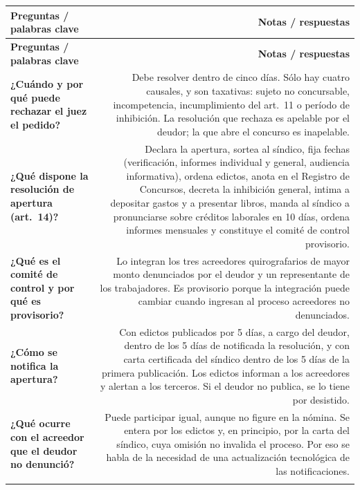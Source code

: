 \documentclass[12pt,oneside]{book}
\begin{document}
\begin{longtable}{QN}
\toprule
\textbf{Preguntas / palabras clave} & \textbf{Notas / respuestas} \\
\midrule
\endfirsthead
\toprule
\textbf{Preguntas / palabras clave} & \textbf{Notas / respuestas} \\
\midrule
\endhead

\textbf{¿Cuándo y por qué puede rechazar el juez el pedido?} &
Debe resolver dentro de cinco días. Sólo hay cuatro causales, y son taxativas: sujeto no concursable, incompetencia, incumplimiento del art.~11 o período de inhibición. La resolución que rechaza es apelable por el deudor; la que abre el concurso es inapelable. \\
\addlinespace[0.6em]

\textbf{¿Qué dispone la resolución de apertura (art.~14)?} &
Declara la apertura, sortea al síndico, fija fechas (verificación, informes individual y general, audiencia informativa), ordena edictos, anota en el Registro de Concursos, decreta la inhibición general, intima a depositar gastos y a presentar libros, manda al síndico a pronunciarse sobre créditos laborales en 10 días, ordena informes mensuales y constituye el comité de control provisorio. \\
\addlinespace[0.6em]

\textbf{¿Qué es el comité de control y por qué es provisorio?} &
Lo integran los tres acreedores quirografarios de mayor monto denunciados por el deudor y un representante de los trabajadores. Es provisorio porque la integración puede cambiar cuando ingresan al proceso acreedores no denunciados. \\
\addlinespace[0.6em]

\textbf{¿Cómo se notifica la apertura?} &
Con edictos publicados por 5 días, a cargo del deudor, dentro de los 5 días de notificada la resolución, y con carta certificada del síndico dentro de los 5 días de la primera publicación. Los edictos informan a los acreedores y alertan a los terceros. Si el deudor no publica, se lo tiene por desistido. \\
\addlinespace[0.6em]

\textbf{¿Qué ocurre con el acreedor que el deudor no denunció?} &
Puede participar igual, aunque no figure en la nómina. Se entera por los edictos y, en principio, por la carta del síndico, cuya omisión no invalida el proceso. Por eso se habla de la necesidad de una actualización tecnológica de las notificaciones. \\
\addlinespace[0.6em]


\end{longtable}
\end{document}
